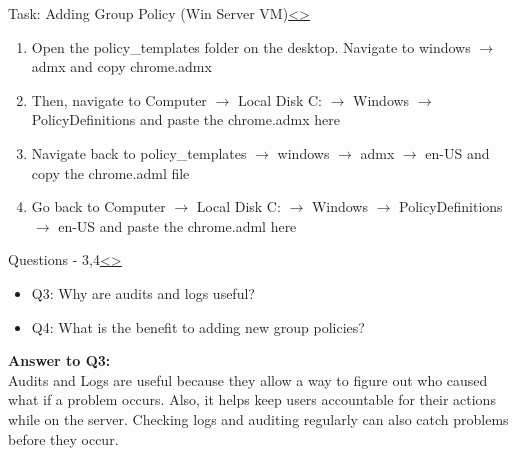 \documentclass[12pt]{extarticle}
\newenvironment{instructionblock}{\Large\bgroup}{\egroup}
\newcommand{\ben}{\begin{enumerate}}
\newcommand{\een}{\end{enumerate}}
\newcommand{\bi}{\begin{itemize}}
\newcommand{\ei}{\end{itemize}}
\begin{document}
	

\pagebreak
\begin{slide}{Task: Adding Group Policy (Win Server VM)}{\hyperref[slide 8]{\textless}\hyperref[slide 10]{\textgreater}}
\vskip 5pt
\begin{instructionblock}
	\ben 
		\item Open the policy\_templates folder on the desktop. Navigate to windows $\rightarrow$ admx and copy chrome.admx
		\item Then, navigate to Computer $\rightarrow$ Local Disk C: $\rightarrow$ Windows $\rightarrow$ PolicyDefinitions and paste the chrome.admx here 
		\item Navigate back to policy\_templates $\rightarrow$ windows $\rightarrow$ admx $\rightarrow$ en-US and copy the chrome.adml file
		\item Go back to Computer $\rightarrow$ Local Disk C: $\rightarrow$ Windows $\rightarrow$ PolicyDefinitions $\rightarrow$ en-US and paste the chrome.adml here
	\een
\end{instructionblock}
 \cite{ChromeGPO}
\end{slide}


\pagebreak
\begin{slide}{Questions - 3,4}{\hyperref[slide 9]{\textless}\hyperref[slide 11]{\textgreater}}
\begin{instructionblock}
\bi 
\item[Q3:] Why are audits and logs useful?
\item[Q4:] What is the benefit to adding new group policies?
\ei

\end{instructionblock}
\end{slide}
\vfill

\vspace{2mm}
\noindent
\textbf{Answer to Q3:}\\
Audits and Logs are useful because they allow a way to figure out who caused what if a problem occurs. Also, it helps keep users accountable for their actions while on the server. Checking logs and auditing regularly can also catch problems before they occur.
\end{document}
